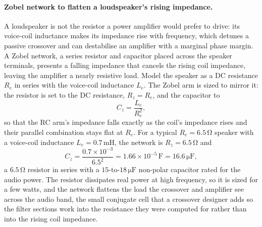 \paragraph{Zobel network to flatten a loudspeaker's rising impedance.}
A loudspeaker is not the resistor a power amplifier would prefer to drive: its
voice-coil inductance makes its impedance rise with frequency, which detunes a
passive crossover and can destabilise an amplifier with a marginal phase margin.
A Zobel network, a series resistor and capacitor placed across the speaker
terminals, presents a falling impedance that cancels the rising coil impedance,
leaving the amplifier a nearly resistive load. Model the speaker as a DC
resistance $R_e$ in series with the voice-coil inductance $L_e$. The Zobel arm is
sized to mirror it: the resistor is set to the DC resistance, $R_z = R_e$, and
the capacitor to
\[
C_z = \frac{L_e}{R_e^{2}},
\]
so that the RC arm's impedance falls exactly as the coil's impedance rises and
their parallel combination stays flat at $R_e$. For a typical
$R_e = 6.5\,\si{\ohm}$ speaker with a voice-coil inductance $L_e = 0.7\,\si{
\milli\henry}$, the network is $R_z = 6.5\,\si{\ohm}$ and
\[
C_z = \frac{0.7\times 10^{-3}}{6.5^{2}} = 1.66\times 10^{-5}\,\si{\farad}
= 16.6\,\si{\micro\farad},
\]
a $6.5\,\si{\ohm}$ resistor in series with a $15$-to-$18\,\si{\micro\farad}$
non-polar capacitor rated for the audio power. The resistor dissipates real power
at high frequency, so it is sized for a few watts, and the network flattens the
load the crossover and amplifier see across the audio band, the small conjugate
cell that a crossover designer adds so the filter sections work into the
resistance they were computed for rather than into the rising coil impedance.

